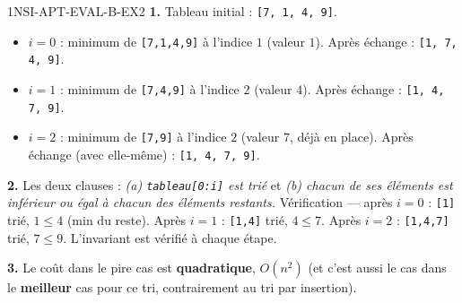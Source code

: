\begin{corrige}{1NSI-APT-EVAL-B-EX2}
\textbf{1.} Tableau initial : \lstinline{[7, 1, 4, 9]}.
\begin{itemize}
  \item $i=0$ : minimum de \lstinline{[7,1,4,9]} à l'indice $1$ (valeur $1$). Après échange : \lstinline{[1, 7, 4, 9]}.
  \item $i=1$ : minimum de \lstinline{[7,4,9]} à l'indice $2$ (valeur $4$). Après échange : \lstinline{[1, 4, 7, 9]}.
  \item $i=2$ : minimum de \lstinline{[7,9]} à l'indice $2$ (valeur $7$, déjà en place). Après échange (avec elle-même) : \lstinline{[1, 4, 7, 9]}.
\end{itemize}

\textbf{2.} Les deux clauses : \emph{(a) \lstinline{tableau[0:i]} est trié} et
\emph{(b) chacun de ses éléments est inférieur ou égal à chacun des éléments restants.}
Vérification — après $i=0$ : \lstinline{[1]} trié, $1\leqslant4$ (min du reste). Après $i=1$ :
\lstinline{[1,4]} trié, $4\leqslant7$. Après $i=2$ : \lstinline{[1,4,7]} trié,
$7\leqslant9$. L'invariant est vérifié à chaque étape.

\textbf{3.} Le coût dans le pire cas est \textbf{quadratique}, $O(n^2)$ (et c'est aussi
le cas dans le \textbf{meilleur} cas pour ce tri, contrairement au tri par insertion).
\end{corrige}

